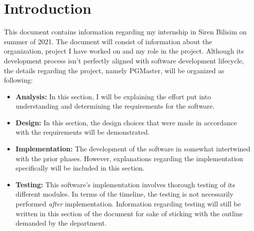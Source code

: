 \chapter{Introduction}

This document contains information regarding my internship in Siren Bilisim 
on summer of 2021. The document will consist of information about the 
organization, project I have worked on and my role in the project. 
Although its development process isn't perfectly aligned with software 
development lifecycle, the details regarding the project, namely PGMaster, 
will be organized as following:

\begin{itemize}
    \item \textbf{Analysis:} In this section, I will be explaining the effort 
    put into understanding and determining the requirements for the software.
    \item \textbf{Design:} In this section, the design choices that were made 
    in accordance with the requirements will be demonstrated.
    \item \textbf{Implementation:} The development of the software in somewhat 
    intertwined with the prior phases. However, explanations regarding the 
    implementation specifically will be included in this section.
    \item \textbf{Testing:} This software's implementation involves thorough 
    testing of its different modules. In terms of the timeline, the testing is 
    not necessarily performed \textit{after} implementation. Information 
    regarding testing will still be written in this section of the document 
    for sake of sticking with the outline demanded by the department.
\end{itemize}

\par

